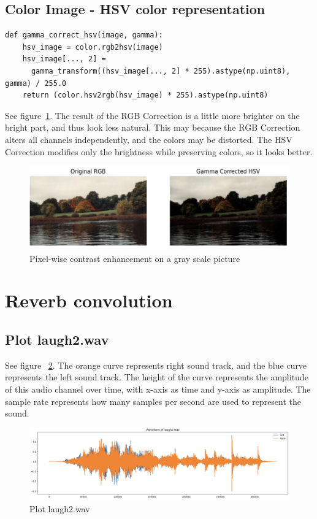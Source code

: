 \documentclass[12pt]{article}
\begin{document}
\subsection{Color Image - HSV color representation}

\begin{lstlisting}
def gamma_correct_hsv(image, gamma):
    hsv_image = color.rgb2hsv(image)
    hsv_image[..., 2] = 
      gamma_transform((hsv_image[..., 2] * 255).astype(np.uint8), gamma) / 255.0
    return (color.hsv2rgb(hsv_image) * 255).astype(np.uint8)
\end{lstlisting}

 See figure~\ref{fig:1.3}. 
 The result of the RGB Correction is a little more brighter on the bright part, and thus look less natural. This may because the RGB Correction alters all channels independently, and the colors may be distorted. The HSV Correction modifies only the brightness while preserving colors, so it looks better.

\begin{figure}[ht]
\centering
    \includegraphics[width=0.7\columnwidth, keepaspectratio]{pics/a2-1.3}
\caption[]{Pixel-wise contrast enhancement on a gray scale picture}
\label{fig:1.3}
\end{figure}

\section{Reverb convolution}
\subsection{Plot laugh2.wav}
See figure ~\ref{fig:2.1}. The orange curve represents right sound track, and the blue curve represents the left sound track. The height of the curve represents the amplitude of this audio channel over time, with x-axis as time and y-axis as amplitude.
The sample rate represents how many samples per second are used to represent the sound.

\begin{figure}[ht]
\centering
    \includegraphics[width=0.7\columnwidth, keepaspectratio]{pics/a2-2.1}
\caption[]{Plot laugh2.wav}
\label{fig:2.1}
\end{figure}
\end{document}
